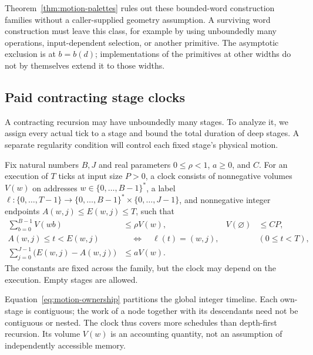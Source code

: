 Theorem~\ref{thm:motion-palettes} rules out these bounded-word construction
families without a caller-supplied geometry assumption.  A surviving word
construction must leave this class, for example by using unboundedly many
operations, input-dependent selection, or another primitive.  The asymptotic
exclusion is at $b=b(d)$; implementations of the primitives at other widths
do not by themselves extend it to those widths.

\subsection{Paid contracting stage clocks}

A contracting recursion may have unboundedly many stages.  To analyze it,
we assign every actual tick to a stage and bound the total duration of deep
stages.  A separate regularity condition will control each fixed stage's
physical motion.

\begin{definition}
\label{def:motion-clock}
Fix natural numbers $B,J$ and real parameters $0\le\rho<1$, $a\ge0$, and $C$.
For an execution of $T$ ticks at input size $P>0$, a clock consists of
nonnegative volumes $V(w)$ on addresses $w\in\{0,\ldots,B-1\}^{*}$, a label
$\ell:\{0,\ldots,T-1\}\to\{0,\ldots,B-1\}^{*}\times\{0,\ldots,J-1\}$,
and nonnegative integer endpoints $A(w,j)\le E(w,j)\le T$, such that
\begin{align}
 \sum_{b=0}^{B-1}V(wb)&\le\rho V(w), & V(\varnothing)&\le CP,\label{eq:motion-volumes}\\
 A(w,j)\le t<E(w,j)&\quad\Longleftrightarrow\quad\ell(t)=(w,j),
       &&(0\le t<T),\label{eq:motion-ownership}\\
 \sum_{j=0}^{J-1}\bigl(E(w,j)-A(w,j)\bigr)&\le aV(w).&&\label{eq:motion-own-budget}
\end{align}
The constants are fixed across the family, but the clock may depend on the
execution.  Empty stages are allowed.
\end{definition}

Equation~\eqref{eq:motion-ownership} partitions the global integer timeline.
Each own-stage is contiguous; the work of a node together with its descendants
need not be contiguous or nested.  The clock thus covers more schedules than
depth-first recursion.  Its volume $V(w)$ is an accounting quantity, not an
assumption of independently accessible memory.

